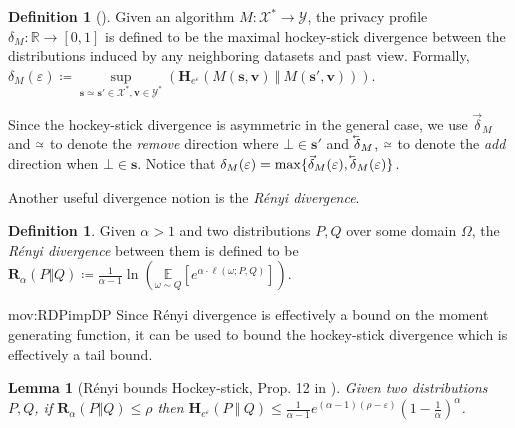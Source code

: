 \documentclass{article}
\newcommand{\Arxiv}[1]{}
\newcommand{\arxvFtnt}[1]{}
\newcommand{\Arxiv}[1]{#1}
\newcommand{\arxvFtnt}[1]{\footnote{#1}}
\theoremstyle{plain}
\newtheorem{lemma}[theorem]{Lemma}
\theoremstyle{definition}
\newtheorem{definition}[theorem]{Definition}
\newcommand{\eps}{\varepsilon}
\newcommand{\reals}{\mathbb{R}}
\newcommand{\lvec}[1]{\reflectbox{$\vec{\reflectbox{$#1$}}$}}
\newcommand{\outDom}{\mathcal{Y}}
\newcommand{\alg}{M}
\newcommand{\domain}{\mathcal{X}}
\newcommand{\dataset}{\boldsymbol{s}}
\newcommand{\view}{\boldsymbol{v}}
\newcommand{\expect}[2]{\underset{#1}{\mathbb{E}} \left[#2 \right]}
\newcommand{\loss}[3]{\ell\left(#1; #2, #3 \right)}
\newcommand{\Renyi}[1]{\boldsymbol{R}_{#1}}
\newcommand{\RenyiDiv}[3]{\Renyi{#1}\left(#2 \Vert #3 \right)}
\newcommand{\HockeyStick}[1]{\boldsymbol{H}_{#1}}
\newcommand{\HockeyStickDiv}[3]{\HockeyStick{#1}\left(#2 ~\left\Vert~ #3 \right. \right)}
\newcommand{\add}[1]{\lvec{#1}}
\newcommand{\rem}[1]{\vec{#1}}
\newcommand{\simAdd}{\mathrel{\substack{\sim\\[-0.8ex] \scalebox{0.6}{$\leftarrow$}}}}
\newcommand{\simRem}{\mathrel{\substack{\sim\\[-0.8ex] \scalebox{0.6}{$\rightarrow$}}}}
\newcommand{\privProf}[1]{\delta_{#1}}
\newcommand{\privProfAdd}[1]{\add{\delta}_{#1}}
\newcommand{\privProfRem}[1]{\rem{\delta}_{#1}}
\begin{document}
\begin{definition}[\Arxiv{Privacy profile }\citep{BBG18}]\label{def:privProf}
    Given an algorithm $\alg : \domain^{*} \rightarrow \outDom$, the privacy profile $\privProf{\alg} : \reals \rightarrow [0, 1]$ is defined to be the maximal hockey-stick divergence between the distributions induced by any neighboring datasets and past view. Formally, $\privProf{\alg}(\eps) \coloneqq \underset{\dataset \simeq \dataset' \in \domain^{*}, \view \in \outDom^{*}}{\sup} \left( \HockeyStickDiv{e^{\eps}}{\alg(\dataset, \view) }{ \alg(\dataset', \view)} \right)$.
    
    Since the hockey-stick divergence is asymmetric in the general case, we use $\privProfRem{\alg}$ and $\simRem$ to denote the \emph{remove} direction where $\bot \in \dataset'$ and $\privProfAdd{\alg}$, $\simAdd$ to denote the \emph{add} direction when $\bot \in \dataset$. Notice that $\privProf{\alg}(\eps) = \max\{\privProfRem{\alg}(\eps), \privProfAdd{\alg}(\eps) \}$. 
\end{definition}

Another useful divergence notion is the \emph{R\'{e}nyi divergence}.
\begin{definition}\Arxiv{[R\'{e}nyi divergence]}\label{def:renDiv}
    Given $\alpha > 1$ and two distributions $P, Q$ over some domain $\Omega$, the \emph{R\'{e}nyi divergence} between them is defined to be $\RenyiDiv{\alpha}{P}{Q} \coloneqq \frac{1}{\alpha-1} \ln \left(\expect{\omega  \sim Q}{e^{\alpha \cdot \loss{\omega}{P}{Q}}} \right)$.\arxvFtnt{The cases of $\alpha = 1$ and $\alpha = \infty$ are defined by continuity which results in $\Renyi{1} = \boldsymbol{D}_{KL}$ - the KL divergence, and $\Renyi{\infty} = \boldsymbol{D}_{\infty}$ - the max divergence.}
\end{definition}

\begin{movable}{mov:RDPimpDP}{}
Since R\'{e}nyi divergence is effectively a bound on the moment generating function, it can be used to bound the hockey-stick divergence which is effectively a tail bound.
\begin{lemma}[R\'{e}nyi bounds Hockey-stick, Prop. 12 in \citet{CKS20}]\label{lem:RDPtoDP}
    Given two distributions $P, Q$, if $\RenyiDiv{\alpha}{P}{Q} \le \rho$ then $\HockeyStickDiv{e^{\eps}}{P}{Q} \le \frac{1}{\alpha-1}e^{(\alpha-1)(\rho - \eps)}\left(1 - \frac{1}{\alpha} \right)^{\alpha}$.
\end{lemma}
\end{movable}
\end{document}

